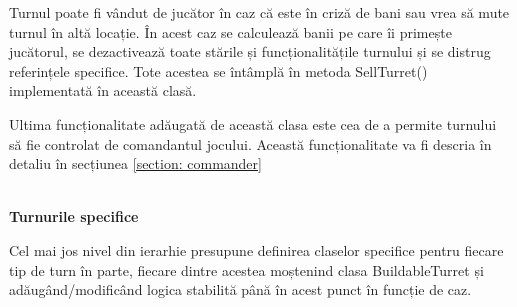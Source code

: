 \documentclass[12pt, a4paper]{article}
\begin{document}
	Turnul poate fi vândut de jucător în caz că este în criză de bani sau vrea să mute turnul în altă locație. În acest caz se calculează banii pe care îi primește jucătorul, se dezactivează toate stările și funcționalitățile turnului și se distrug referințele specifice. Tote acestea se întâmplă în metoda SellTurret() implementată în această clasă.
	\newline
	
	Ultima funcționalitate adăugată de această clasa este cea de a permite turnului să fie controlat de comandantul jocului. Această funcționalitate va fi descria în detaliu în secțiunea \ref{section: commander} 
	
	\ \\
	\textbf{Turnurile specifice}
	
	Cel mai jos nivel din ierarhie presupune definirea claselor specifice pentru fiecare tip de turn în parte, fiecare dintre acestea moștenind clasa BuildableTurret și adăugând/modificând logica stabilită până în acest punct în funcție de caz.
	
\end{document}

